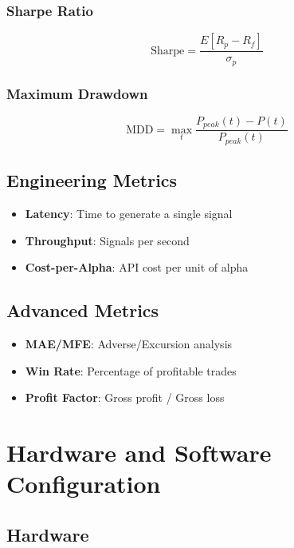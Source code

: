 \subsubsection{Sharpe Ratio}

\begin{equation}
\text{Sharpe} = \frac{E[R_p - R_f]}{\sigma_p}
\end{equation}

\subsubsection{Maximum Drawdown}

\begin{equation}
\text{MDD} = \max_{t} \frac{P_{peak}(t) - P(t)}{P_{peak}(t)}
\end{equation}

\subsection{Engineering Metrics}

\begin{itemize}
    \item \textbf{Latency}: Time to generate a single signal
    \item \textbf{Throughput}: Signals per second
    \item \textbf{Cost-per-Alpha}: API cost per unit of alpha
\end{itemize}

\subsection{Advanced Metrics}

\begin{itemize}
    \item \textbf{MAE/MFE}: Adverse/Excursion analysis
    \item \textbf{Win Rate}: Percentage of profitable trades
    \item \textbf{Profit Factor}: Gross profit / Gross loss
\end{itemize}

\section{Hardware and Software Configuration}

\subsection{Hardware}

